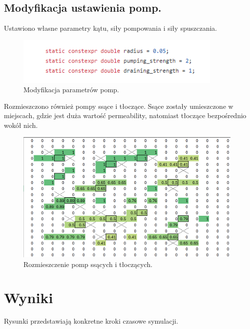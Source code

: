 \documentclass[onecolumn,12pt]{article}
\begin{document}
\subsection{Modyfikacja ustawienia pomp.}
 Ustawiono własne parametry kątu, siły pompowania i siły spuszczania.
\begin{figure}[H]
    \centering
    \includegraphics[width=0.9\textwidth]{pumps_params.png}
    \caption{Modyfikacja parametrów pomp.}
    \label{fig:example}
\end{figure}

Rozmieszczono również pompy ssące i tłoczące. Ssące zostały umieszczone w miejscach, gdzie jest duża wartość permeability, natomiast tłoczące bezpośrednio wokół nich.
\begin{figure}[H]
    \centering
    \includegraphics[width=1.0\textwidth]{project_oil2d/oil_raport/pumps-sinks.png}
    \caption{Rozmieszczenie pomp ssących i tłoczących.}
    \label{fig:example}
\end{figure}
\section{Wyniki}

Rysunki przedstawiają konkretne kroki czasowe symulacji.
\end{document}
